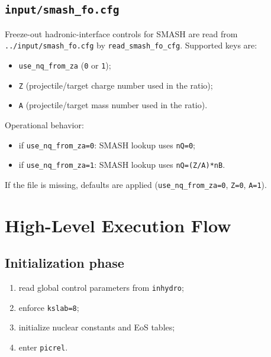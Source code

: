 \documentclass[11pt,a4paper]{article}
\begin{document}
\subsection{\texttt{input/smash\_fo.cfg}}
Freeze-out hadronic-interface controls for SMASH are read from
\texttt{../input/smash\_fo.cfg} by \texttt{read\_smash\_fo\_cfg}.
Supported keys are:
\begin{itemize}
\item \texttt{use\_nq\_from\_za} (\texttt{0} or \texttt{1});
\item \texttt{Z} (projectile/target charge number used in the ratio);
\item \texttt{A} (projectile/target mass number used in the ratio).
\end{itemize}
Operational behavior:
\begin{itemize}
\item if \texttt{use\_nq\_from\_za=0}: SMASH lookup uses \texttt{nQ=0};
\item if \texttt{use\_nq\_from\_za=1}: SMASH lookup uses
      \texttt{nQ=(Z/A)*nB}.
\end{itemize}
If the file is missing, defaults are applied
(\texttt{use\_nq\_from\_za=0}, \texttt{Z=0}, \texttt{A=1}).

\section{High-Level Execution Flow}
\subsection{Initialization phase}
\begin{enumerate}
\item read global control parameters from \texttt{inhydro};
\item enforce \texttt{kslab=8};
\item initialize nuclear constants and EoS tables;
\item enter \texttt{picrel}.
\end{enumerate}
\end{document}
